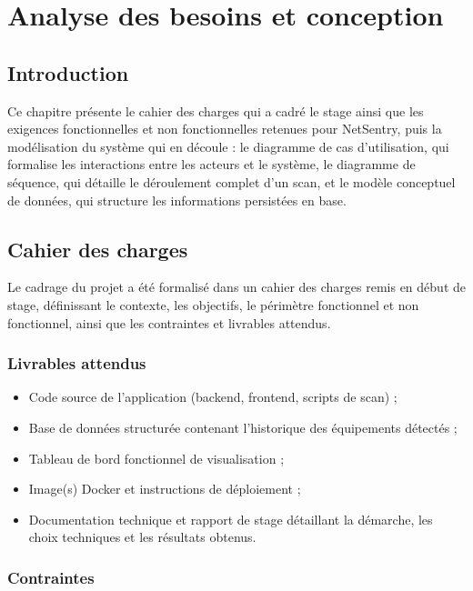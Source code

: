 \chapter{Analyse des besoins et conception}
\label{chap:analyse_conception}

\section{Introduction}

Ce chapitre présente le cahier des charges qui a cadré le stage ainsi que les exigences
fonctionnelles et non fonctionnelles retenues pour NetSentry, puis la modélisation du
système qui en découle : le diagramme de cas d'utilisation, qui formalise les
interactions entre les acteurs et le système, le diagramme de séquence, qui détaille le
déroulement complet d'un scan, et le modèle conceptuel de données, qui structure les
informations persistées en base.

\section{Cahier des charges}

Le cadrage du projet a été formalisé dans un cahier des charges remis en début de
stage, définissant le contexte, les objectifs, le périmètre fonctionnel et non
fonctionnel, ainsi que les contraintes et livrables attendus.

\subsection{Livrables attendus}

\begin{itemize}
    \item Code source de l'application (backend, frontend, scripts de scan) ;
    \item Base de données structurée contenant l'historique des équipements détectés ;
    \item Tableau de bord fonctionnel de visualisation ;
    \item Image(s) Docker et instructions de déploiement ;
    \item Documentation technique et rapport de stage détaillant la démarche, les choix
    techniques et les résultats obtenus.
\end{itemize}

\subsection{Contraintes}


